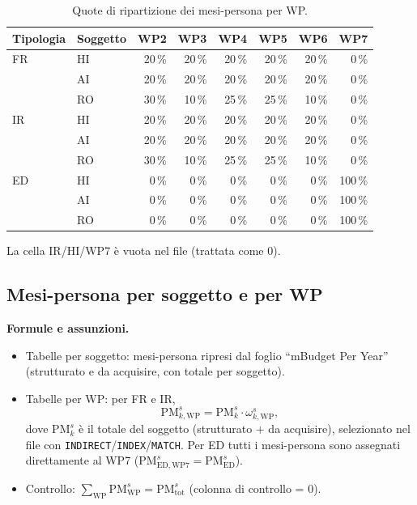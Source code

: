 \documentclass{plan4ari_report}
\newcommand{\ED}{\mathrm{ED}}
\begin{document}
\begin{table}[H]\centering\small\caption{Quote di ripartizione dei mesi-persona per WP.}\label{tab:wpshare}
\begin{tabular}{llrrrrrr}\toprule\textbf{Tipologia} & \textbf{Soggetto} & \textbf{WP2} & \textbf{WP3} & \textbf{WP4} & \textbf{WP5} & \textbf{WP6} & \textbf{WP7} \\\midrule
FR & HI & 20\,\% & 20\,\% & 20\,\% & 20\,\% & 20\,\% & 0\,\% \\
 & AI & 20\,\% & 20\,\% & 20\,\% & 20\,\% & 20\,\% & 0\,\% \\
 & RO & 30\,\% & 10\,\% & 25\,\% & 25\,\% & 10\,\% & 0\,\% \\
\midrule
IR & HI & 20\,\% & 20\,\% & 20\,\% & 20\,\% & 20\,\% & 0\,\% \\
 & AI & 20\,\% & 20\,\% & 20\,\% & 20\,\% & 20\,\% & 0\,\% \\
 & RO & 30\,\% & 10\,\% & 25\,\% & 25\,\% & 10\,\% & 0\,\% \\
\midrule
ED & HI & 0\,\% & 0\,\% & 0\,\% & 0\,\% & 0\,\% & 100\,\% \\
 & AI & 0\,\% & 0\,\% & 0\,\% & 0\,\% & 0\,\% & 100\,\% \\
 & RO & 0\,\% & 0\,\% & 0\,\% & 0\,\% & 0\,\% & 100\,\% \\
\bottomrule\end{tabular}
\par\smallskip\footnotesize La cella IR/HI/WP7 \`e vuota nel file (trattata come 0).
\end{table}


\subsection{Mesi-persona per soggetto e per WP}
\textbf{Formule e assunzioni.}
\begin{itemize}
  \item Tabelle per soggetto: mesi-persona ripresi dal foglio ``mBudget Per Year'' (strutturato e da acquisire, con totale per soggetto).
  \item Tabelle per WP: per FR e IR,
  \[ \mathrm{PM}^{s}_{k,\mathrm{WP}} = \mathrm{PM}^{s}_{k}\cdot \omega^{s}_{k,\mathrm{WP}}, \]
  dove $\mathrm{PM}^{s}_{k}$ \`e il totale del soggetto (strutturato + da acquisire), selezionato nel file con \texttt{INDIRECT}/\texttt{INDEX}/\texttt{MATCH}. Per ED tutti i mesi-persona sono assegnati direttamente al WP7 ($\mathrm{PM}^{s}_{\ED,\mathrm{WP7}} = \mathrm{PM}^{s}_{\ED}$).
  \item Controllo: $\sum_{\mathrm{WP}} \mathrm{PM}^{s}_{\mathrm{WP}} = \mathrm{PM}^{s}_{\mathrm{tot}}$ (colonna di controllo = 0).
\end{itemize}
\end{document}
